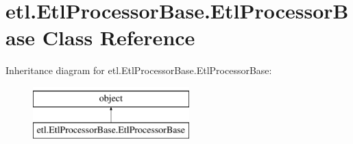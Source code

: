 \hypertarget{classetl_1_1EtlProcessorBase_1_1EtlProcessorBase}{\section{etl.\-Etl\-Processor\-Base.\-Etl\-Processor\-Base Class Reference}
\label{classetl_1_1EtlProcessorBase_1_1EtlProcessorBase}
}
Inheritance diagram for etl.\-Etl\-Processor\-Base.\-Etl\-Processor\-Base\-:\begin{figure}[H]
\begin{center}
\leavevmode
\includegraphics[height=2.000000cm]{classetl_1_1EtlProcessorBase_1_1EtlProcessorBase}
\end{center}
\end{figure}
